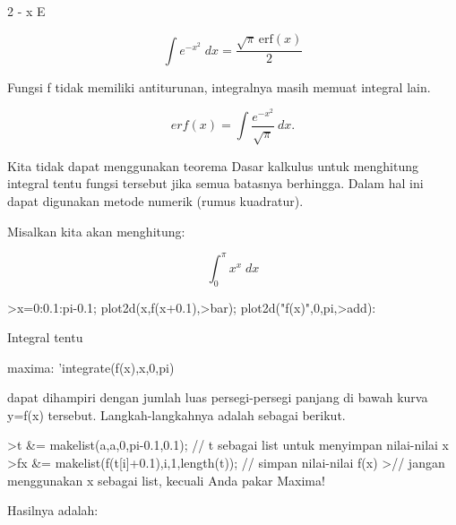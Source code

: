\documentclass[a4paper,10pt]{article}
\begin{document}
\begin{eulernotebook}
\begin{eulercomment}
\begin{eulercomment}
\begin{eulercomment}
\begin{eulercomment}
\begin{eulercomment}
\begin{eulercomment}
\begin{eulercomment}
\begin{eulercomment}
\begin{euleroutput}
                                      2
                                   - x
                                  E
  
\end{euleroutput}
\begin{eulerformula}
\[
\int {e^ {- x^2 }}{\;dx}=\frac{\sqrt{\pi}\,\mathrm{erf}\left(x
 \right)}{2}
\]
\end{eulerformula}
\begin{eulercomment}
Fungsi f tidak memiliki antiturunan, integralnya masih memuat integral
lain.

\end{eulercomment}
\begin{eulerformula}
\[
erf(x) = \int \frac{e^{-x^2}}{\sqrt{\pi}} \ dx.
\]
\end{eulerformula}
\begin{eulercomment}
Kita tidak dapat menggunakan teorema Dasar kalkulus untuk menghitung
integral tentu fungsi tersebut jika semua batasnya berhingga. Dalam
hal ini dapat digunakan metode numerik (rumus kuadratur).

Misalkan kita akan menghitung:

\end{eulercomment}
\begin{eulerformula}
\[
\int_{0}^{\pi}{x^{x}\;dx}
\]
\end{eulerformula}
\begin{eulerprompt}
>x=0:0.1:pi-0.1; plot2d(x,f(x+0.1),>bar); plot2d("f(x)",0,pi,>add):
\end{eulerprompt}
\begin{eulercomment}
Integral tentu

maxima: 'integrate(f(x),x,0,pi)

dapat dihampiri dengan jumlah luas persegi-persegi panjang di bawah
kurva y=f(x) tersebut. Langkah-langkahnya adalah sebagai berikut.
\end{eulercomment}
\begin{eulerprompt}
>t &= makelist(a,a,0,pi-0.1,0.1); // t sebagai list untuk menyimpan nilai-nilai x
>fx &= makelist(f(t[i]+0.1),i,1,length(t)); // simpan nilai-nilai f(x)
>// jangan menggunakan x sebagai list, kecuali Anda pakar Maxima!
\end{eulerprompt}
\begin{eulercomment}
Hasilnya adalah:


\end{eulercomment}
\end{eulercomment}
\end{eulercomment}
\end{eulercomment}
\end{eulercomment}
\end{eulercomment}
\end{eulercomment}
\end{eulercomment}
\end{eulercomment}
\end{eulernotebook}
\end{document}
